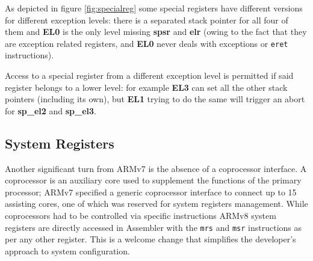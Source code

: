 \documentclass[12pt,a4paper,openright,twoside]{report}
\begin{document}
As depicted in figure \ref{fig:specialreg} some special registers have different
versions for different exception levels: there is a separated stack pointer 
for all four of them and \textbf{EL0} is the only level missing \textbf{spsr}
and \textbf{elr} (owing to the fact that they are exception related registers, and
\textbf{EL0} never deals with exceptions or {\tt eret} instructions).

Access to a special register from a different exception level is permitted if 
said register belongs to a lower level: for example \textbf{EL3} can set all the
other stack pointers (including its own), but \textbf{EL1} trying 
to do the same will trigger an abort for \textbf{sp\_el2} and \textbf{sp\_el3}.

\subsection{System Registers}
Another significant turn from ARMv7 is the absence of a coprocessor interface.
A coprocessor is an auxiliary core used to supplement the functions of the primary
processor; ARMv7 specified a generic coprocessor interface to connect up to 
15 assisting cores, one of which was reserved for system registers management.
While coprocessors had to be controlled via specific instructions ARMv8 system registers
are directly accessed in Assembler with the {\tt mrs} and {\tt msr} instructions
as per any other register. This is a welcome change that simplifies the developer's
approach to system configuration.
\end{document}
